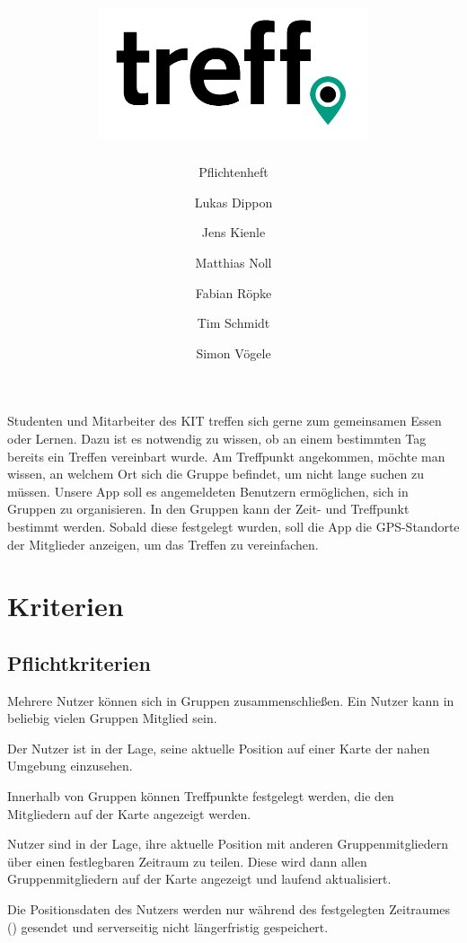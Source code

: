 \documentclass[parskip=full,11pt]{scrartcl}
\title{\includegraphics[width = 80mm]{images/logo_crop.png}}
\subtitle{\huge Pflichtenheft}
\author{Lukas Dippon
        \and Jens Kienle
        \and Matthias Noll
        \and Fabian Röpke
        \and Tim Schmidt
        \and Simon Vögele}
\begin{document}
\maketitle
\thispagestyle{empty} %

\section*{} %
Studenten und Mitarbeiter des KIT treffen sich gerne zum gemeinsamen Essen oder Lernen.
Dazu ist es notwendig zu wissen, ob an einem bestimmten Tag bereits ein Treffen vereinbart wurde.
Am Treffpunkt angekommen, möchte man wissen, an welchem Ort sich die Gruppe befindet, um nicht lange suchen zu müssen.
Unsere App soll es angemeldeten Benutzern ermöglichen, sich in Gruppen zu organisieren.
In den Gruppen kann der Zeit- und Treffpunkt bestimmt werden.
Sobald diese festgelegt wurden, soll die App die GPS-Standorte der Mitglieder anzeigen, um das Treffen zu vereinfachen.

\pagebreak
\tableofcontents

\pagebreak
\section{Kriterien}

\subsection{Pflichtkriterien}
Mehrere Nutzer können sich in Gruppen zusammenschließen.
Ein Nutzer kann in beliebig vielen Gruppen Mitglied sein.

Der Nutzer ist in der Lage, seine aktuelle Position auf einer Karte der nahen
Umgebung einzusehen.

Innerhalb von Gruppen können Treffpunkte festgelegt werden,
die den Mitgliedern auf der Karte angezeigt werden.

Nutzer sind in der Lage, ihre aktuelle Position mit anderen Gruppenmitgliedern
über einen festlegbaren Zeitraum zu teilen.
Diese wird dann allen Gruppenmitgliedern auf der Karte angezeigt und laufend
aktualisiert.

Die Positionsdaten des Nutzers werden nur während des festgelegten Zeitraumes
() gesendet und serverseitig nicht
längerfristig gespeichert.
\end{document}
